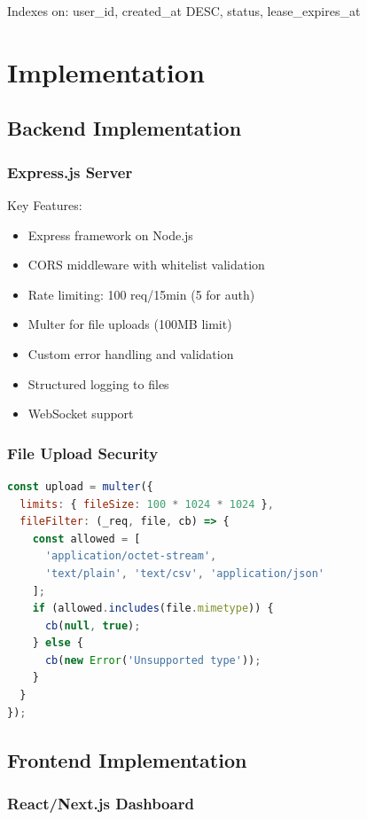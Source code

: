 \documentclass[12pt,a4paper]{report}
\begin{document}
Indexes on: user\_id, created\_at DESC, status, lease\_expires\_at

\chapter{Implementation}

\section{Backend Implementation}

\subsection{Express.js Server}

Key Features:
\begin{itemize}
    \item Express framework on Node.js
    \item CORS middleware with whitelist validation
    \item Rate limiting: 100 req/15min (5 for auth)
    \item Multer for file uploads (100MB limit)
    \item Custom error handling and validation
    \item Structured logging to files
    \item WebSocket support
\end{itemize}

\subsection{File Upload Security}

\begin{lstlisting}[language=JavaScript]
const upload = multer({
  limits: { fileSize: 100 * 1024 * 1024 },
  fileFilter: (_req, file, cb) => {
    const allowed = [
      'application/octet-stream',
      'text/plain', 'text/csv', 'application/json'
    ];
    if (allowed.includes(file.mimetype)) {
      cb(null, true);
    } else {
      cb(new Error('Unsupported type'));
    }
  }
});
\end{lstlisting}

\section{Frontend Implementation}

\subsection{React/Next.js Dashboard}
\end{document}
